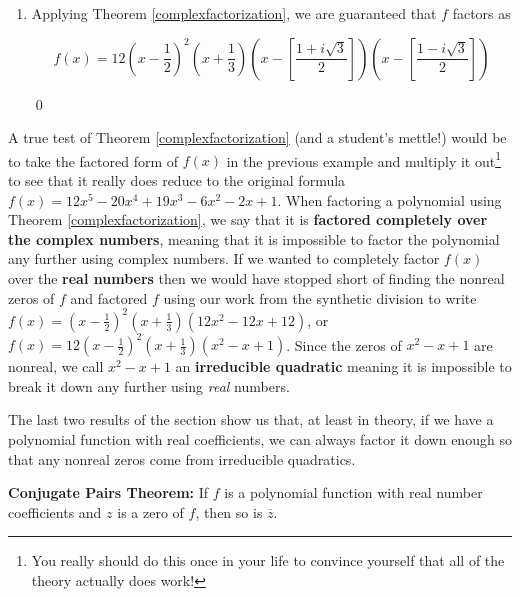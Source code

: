 \begin{ex}
\begin{enumerate}
\item  Applying Theorem \ref{complexfactorization}, we are guaranteed that $f$ factors as

\[f(x) = 12 \left(x- \dfrac{1}{2}\right)^2 \left(x + \dfrac{1}{3}\right) \left(x - \left[\dfrac{1 + i \sqrt{3}}{2}\right]\right) \left(x - \left[\dfrac{1 - i \sqrt{3}}{2}\right]\right)\]

\vspace{-.4in} \qed

\end{enumerate}

\end{ex}

A true test of Theorem \ref{complexfactorization} (and a student's mettle!) would be to take the factored form of $f(x)$ in the previous example and multiply it out\footnote{You really should do this once in your life to convince yourself that all of the theory actually does work!} to see that it really does reduce to the original formula  $f(x) = 12x^5 - 20x^4+19x^3-6x^2-2x+1$.  When factoring a polynomial using Theorem \ref{complexfactorization}, we say that it is  \textbf{factored completely over the complex numbers}, meaning that it is impossible to factor the polynomial any further using complex numbers.  If we wanted to   completely factor $f(x)$ over the \textbf{real numbers} then we would have stopped short of finding the nonreal zeros of $f$ and factored $f$ using our work from the synthetic division to write $f(x) = \left(x - \frac{1}{2} \right)^2 \left(x + \frac{1}{3} \right)\left(12x^2 - 12x + 12\right)$, or $f(x) = 12\left(x - \frac{1}{2} \right)^2 \left(x + \frac{1}{3} \right)\left(x^2 - x + 1\right)$.  Since the zeros of $x^2-x+1$ are nonreal, we call $x^2-x+1$ an \textbf{irreducible quadratic} meaning it is impossible to break it down any further using \emph{real} numbers.  

\smallskip

The last two results of the section show us that, at least in theory, if we have a polynomial function with real coefficients, we can always factor it down enough so that any nonreal zeros come from irreducible quadratics.

\smallskip

\colorbox{ResultColor}{\bbm

\begin{thm} \label{conjugatepairsthm}\textbf{Conjugate Pairs Theorem:} If $f$ is a polynomial function with real number coefficients and $z$ is a zero of $f$, then so is $\overline{z}$. 

\end{thm}

\ebm}

